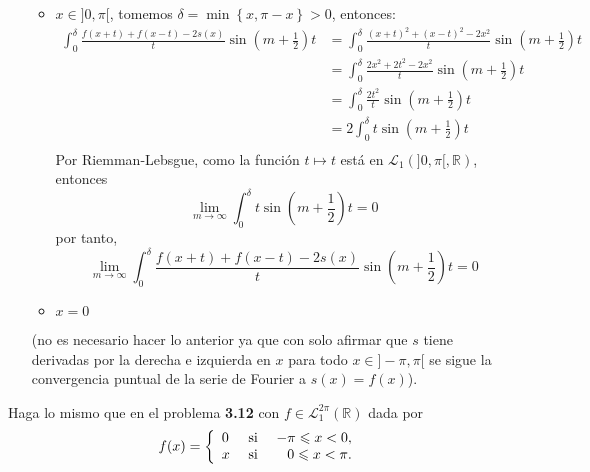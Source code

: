 \documentclass[12pt]{report}
\newcounter{it}
\theoremstyle{largebreak}
\renewcommand{\leq}{\ensuremath{\leqslant}}
\begin{document}
\begin{sol}
\begin{itemize}
\begin{itemize}
\begin{equation*}
                \end{equation*}
                \item $x\in]0,\pi[$, tomemos $\delta=\min\left\{x,\pi-x\right\}>0$, entonces:
                \begin{equation*}
                    \begin{split}
                        \int_{0}^\delta\frac{f(x+t)+f(x-t)-2s(x)}{t}\sin\left(m+\frac{1}{2}\right)t&=\int_{0}^{\delta}\frac{(x+t)^2+(x-t)^2-2x^2}{t}\sin\left(m+\frac{1}{2}\right)t\\
                        &=\int_{0}^{\delta}\frac{2x^2+2t^2-2x^2}{t}\sin\left(m+\frac{1}{2}\right)t\\
                        &=\int_{0}^{\delta}\frac{2t^2}{t}\sin\left(m+\frac{1}{2}\right)t\\
                        &=2\int_{0}^{\delta}t\sin\left(m+\frac{1}{2}\right)t\\
                    \end{split}
                \end{equation*}
                Por Riemman-Lebsgue, como la función $t\mapsto t$ está en $\mathcal{L}_1(]0,\pi[,\mathbb{R})$, entonces
                \begin{equation*}
                    \lim_{ m\rightarrow\infty}\int_{0}^{\delta}t\sin\left(m+\frac{1}{2}\right)t=0
                \end{equation*}
                por tanto,
                \begin{equation*}
                    \lim_{m\rightarrow\infty}\int_{0}^\delta\frac{f(x+t)+f(x-t)-2s(x)}{t}\sin\left(m+\frac{1}{2}\right)t=0
                \end{equation*}
                \item $x=0$
            \end{itemize}
            (no es necesario hacer lo anterior ya que con solo afirmar que $s$ tiene derivadas por la derecha e izquierda en $x$ para todo $x\in]-\pi,\pi[$ se sigue la convergencia puntual de la serie de Fourier a $s(x)=f(x)$).
        \end{itemize}
    \end{sol}

    \begin{excer}
        Haga lo mismo que en el problema \textbf{3.12} con $f\in\mathcal{L}_1^{2\pi}(\mathbb{R})$ dada por
        \begin{equation*}
            f(x)=\left\{ 
                \begin{array}{lcr}
                    0 & \textup{ si } & -\pi\leq x<0,\\
                    x & \textup{ si } & 0\leq x<\pi.\\
                \end{array}
            \right.
        \end{equation*}
    \end{excer}

    \begin{sol}
        
    \end{sol}
\end{document}
